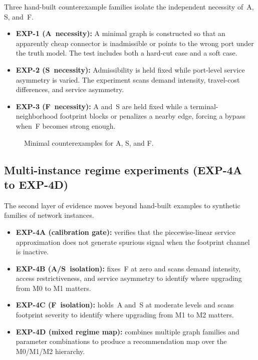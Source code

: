 \documentclass[review,authoryear]{elsarticle}
\begin{document}
Three hand-built counterexample families isolate the independent necessity of~A, S, and~F.

\begin{itemize}
  \item \textbf{EXP-1 (A~necessity):} A minimal graph is constructed so that an apparently cheap connector is inadmissible or points to the wrong port under the truth model. The test includes both a hard-cut case and a soft case.
  \item \textbf{EXP-2 (S~necessity):} Admissibility is held fixed while port-level service asymmetry is varied. The experiment scans demand intensity, travel-cost differences, and service asymmetry.
  \item \textbf{EXP-3 (F~necessity):} A and~S are held fixed while a terminal-neighborhood footprint blocks or penalizes a nearby edge, forcing a bypass when~F becomes strong enough.
\end{itemize}

\begin{figure}[htbp]
  \centering
  \caption{Minimal counterexamples for A, S, and F.}
  \label{fig:counterexamples}
\end{figure}

\subsection{Multi-instance regime experiments (EXP-4A to EXP-4D)}
\label{sec:exp:regime}

The second layer of evidence moves beyond hand-built examples to synthetic families of network instances.

\begin{itemize}
  \item \textbf{EXP-4A (calibration gate):} verifies that the piecewise-linear service approximation does not generate spurious signal when the footprint channel is inactive.
  \item \textbf{EXP-4B (A/S~isolation):} fixes~F at zero and scans demand intensity, access restrictiveness, and service asymmetry to identify where upgrading from M0 to M1 matters.
  \item \textbf{EXP-4C (F~isolation):} holds~A and~S at moderate levels and scans footprint severity to identify where upgrading from M1 to M2 matters.
  \item \textbf{EXP-4D (mixed regime map):} combines multiple graph families and parameter combinations to produce a recommendation map over the M0/M1/M2 hierarchy.
\end{itemize}
\end{document}
